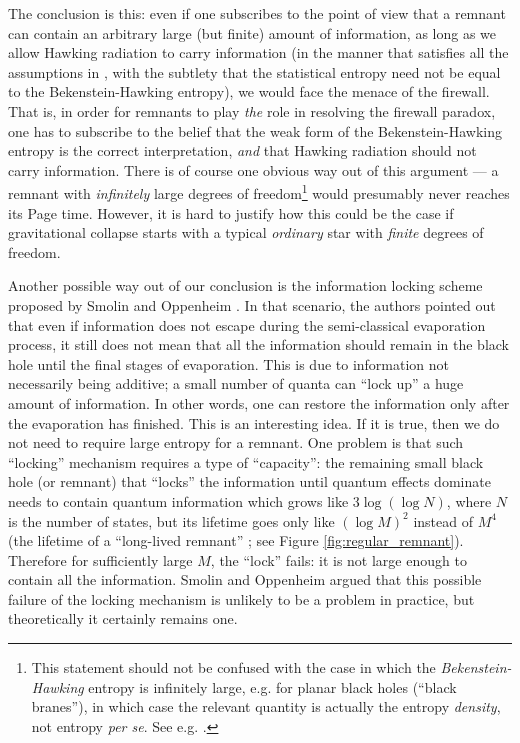 \documentclass[12pt]{article}
\newcommand{\2}{$^2$}
\newcommand{\3}{$^3$}
\newcommand{\4}{$_4$}
\newcommand{\5}{$_5$}
\begin{document}
The conclusion is this: even if one subscribes to the point of view that a remnant can contain an arbitrary large (but finite) amount of information, as long as we allow Hawking radiation to carry information (in the manner that satisfies all the assumptions in \cite{amps}, with the subtlety that the statistical entropy need not be equal to the Bekenstein-Hawking entropy), we would face the menace of the firewall. That is, in order for remnants to play \emph{the} role in resolving the firewall paradox, one has to subscribe to the belief that the weak form of the Bekenstein-Hawking entropy is the correct interpretation, \emph{and} that Hawking radiation should not carry information. There is of course one obvious way out of this argument --- a remnant with \emph{infinitely} large degrees of freedom\footnote{This statement should not be confused with the case in which the \emph{Bekenstein-Hawking} entropy is infinitely large, e.g. for planar black holes (``black branes''), in which case the relevant quantity is actually the entropy \emph{density}, not entropy \emph{per se}. See e.g. \cite{kn:son}.} would presumably never reaches its Page time. However, it is hard to justify how this could be the case if gravitational collapse starts with a typical \emph{ordinary} star with \emph{finite} degrees of freedom. 

Another possible way out of our conclusion is the information locking scheme proposed by Smolin and Oppenheim \cite{SmoOpp}. In that scenario, the authors pointed out that even if information does not escape during the semi-classical evaporation process, it still does not mean that all the
information should remain in the black hole until the final stages of evaporation. This is due to information not necessarily being additive; a small number
of quanta can ``lock up'' a huge amount of information. In other words, one can restore the information only after the evaporation has finished. This is an interesting idea. If it is true, then we do not need to require large entropy for a remnant. One problem is that such ``locking'' mechanism requires a type of ``capacity'': the remaining small black hole (or remnant) that ``locks'' the information until quantum effects dominate needs to contain quantum information which grows like $3 \log(\log N)$, where $N$ is the number of states, but its lifetime goes only like $(\log M)^2$ instead of $M^4$ (the lifetime of  a ``long-lived remnant'' \cite{CW}; see Figure \ref{fig:regular_remnant}). Therefore for sufficiently large $M$, the ``lock'' fails: it is not large enough to contain all the information. Smolin and Oppenheim argued that this possible failure of the locking mechanism is unlikely to be a problem in practice, but theoretically it certainly remains one.
\end{document}
